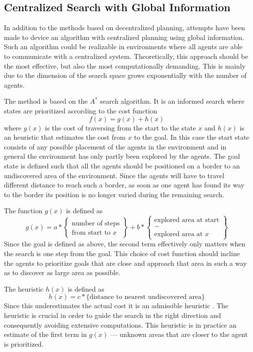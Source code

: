 \documentclass{article}
\begin{document}
\subsection{Centralized Search with Global Information}
In addition to the methods based on decentralized planning, attempts have been
made to device an algorithm with centralized planning using global information.
Such an algorithm could be realizable in environments where all agents are able
to communicate with a centralized system. Theoretically, this approach should
be the most effective, but also the most computationally demanding. This is
mainly due to the dimension of the search space grows exponentially with the
number of agents.

The method is based on the $A^*$ search algorithm. It is an informed search
where states are prioritized according to the cost function
%
$$f(x) = g(x) + h(x)$$
%
where $g(x)$ is the cost of traversing from the start to the state $x$ and
$h(x)$ is an heuristic that estimates the cost from $x$ to the goal. In this
case the start state consists of any possible placement of the agents in the
environment and in general the environment has only partly been explored by the
agents. The goal state is defined such that all the agents should be positioned
on a border to an undiscovered area of the environment. Since the agents will
have to travel different distance to reach such a border, as soon as one agent 
has found its way to the border its position is no longer varied during the 
remaining search.

The function $g(x)$ is defined as
%
$$g(x) = a * \begin{Bmatrix} \text{number of steps} \\ \text{from start to $x$}
\end{Bmatrix} + b * \begin{Bmatrix} \text{explored area at start} \\ - \\ \text{
explored area at $x$} \end{Bmatrix}$$
%
Since the goal is defined as above, the second term effectively only matters
when the search is one step from the goal. This choice of cost function should
incline the agents to prioritize goals that are close and approach that area in
such a way as to discover as large area as possible.

The heuristic $h(x)$ is defined as 
%
$$h(x) = c * \text{\{distance to nearest undiscovered area\} }$$
%
Since this underestimates the actual cost it is an admissible heuristic 
\cite{russell2003artificial}. The heuristic is crucial in order to guide the 
search in the right direction and consequently avoiding extensive computations.
This heuristic is in practice an estimate of the first term in $g(x)$ ---
unknown areas that are closer to the agent is prioritized.
\end{document}
